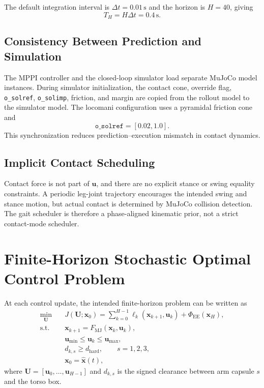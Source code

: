 \documentclass[11pt,a4paper]{article}
\newcommand{\code}[1]{\texttt{#1}}
\begin{document}
The default integration interval is $\Delta t=0.01\,\mathrm{s}$ and the
horizon is $H=40$, giving
\begin{equation}
  T_H=H\Delta t=0.4\,\mathrm{s}.
\end{equation}

\subsection{Consistency Between Prediction and Simulation}

The MPPI controller and the closed-loop simulator load separate MuJoCo model
instances. During simulator initialization, the contact cone, override flag,
\code{o\_solref}, \code{o\_solimp}, friction, and margin are copied from the
rollout model to the simulator model. The locomani configuration uses a
pyramidal friction cone and
\begin{equation}
  \code{o\_solref}=[0.02,1.0].
\end{equation}
This synchronization reduces prediction--execution mismatch in contact
dynamics.

\subsection{Implicit Contact Scheduling}

Contact force is not part of $\bm{u}$, and there are no explicit stance or
swing equality constraints. A periodic leg-joint trajectory encourages the
intended swing and stance motion, but actual contact is determined by MuJoCo
collision detection. The gait scheduler is therefore a phase-aligned
kinematic prior, not a strict contact-mode scheduler.

\section{Finite-Horizon Stochastic Optimal Control Problem}

At each control update, the intended finite-horizon problem can be written as
\begin{equation}
\boxed{
\begin{aligned}
\min_{\bm{U}}\quad
  &J(\bm{U};\bm{x}_0)
  =\sum_{k=0}^{H-1}\ell_k(\bm{x}_{k+1},\bm{u}_k)
   +\Phi_{\mathrm{EE}}(\bm{x}_H),\\
\mathrm{s.t.}\quad
  &\bm{x}_{k+1}=F_{\mathrm{MJ}}(\bm{x}_k,\bm{u}_k),\\
  &\bm{u}_{\min}\leq\bm{u}_k\leq\bm{u}_{\max},\\
  &d_{k,s}\geq d_{\mathrm{hard}},\qquad s=1,2,3,\\
  &\bm{x}_0=\hat{\bm{x}}(t),
\end{aligned}}
\label{eq:finite_ocp}
\end{equation}
where $\bm{U}=[\bm{u}_0,\ldots,\bm{u}_{H-1}]$ and $d_{k,s}$ is the signed
clearance between arm capsule $s$ and the torso box.
\end{document}
